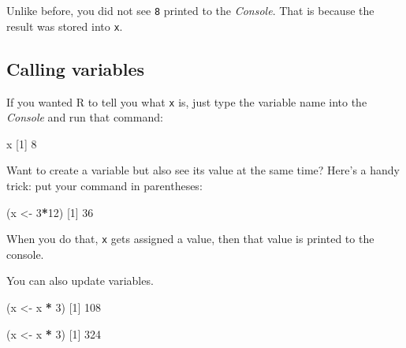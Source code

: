 \documentclass[
]{book}
\newenvironment{Shaded}{\begin{snugshade}}{\end{snugshade}}
\newcommand{\DecValTok}[1]{\textcolor[rgb]{0.00,0.00,0.81}{#1}}
\newcommand{\NormalTok}[1]{#1}
\newcommand{\OperatorTok}[1]{\textcolor[rgb]{0.81,0.36,0.00}{\textbf{#1}}}
\newcommand{\StringTok}[1]{\textcolor[rgb]{0.31,0.60,0.02}{#1}}
\begin{document}
Unlike before, you did not see \texttt{8} printed to the \emph{Console}. That is because the result was stored into \texttt{x}.

\hypertarget{calling-variables}{%
\subsection*{Calling variables}\label{calling-variables}}

If you wanted R to tell you what \texttt{x} is, just type the variable name into the \emph{Console} and run that command:

\begin{Shaded}
\begin{Highlighting}[]
\NormalTok{x}
\NormalTok{[}\DecValTok{1}\NormalTok{] }\DecValTok{8}
\end{Highlighting}
\end{Shaded}

Want to create a variable but also see its value at the same time? Here's a handy trick: put your command in parentheses:

\begin{Shaded}
\begin{Highlighting}[]
\NormalTok{(x <-}\StringTok{ }\DecValTok{3}\OperatorTok{*}\DecValTok{12}\NormalTok{)}
\NormalTok{[}\DecValTok{1}\NormalTok{] }\DecValTok{36}
\end{Highlighting}
\end{Shaded}

When you do that, \texttt{x} gets assigned a value, then that value is printed to the console.

You can also update variables.

\begin{Shaded}
\begin{Highlighting}[]
\NormalTok{(x <-}\StringTok{ }\NormalTok{x }\OperatorTok{*}\StringTok{ }\DecValTok{3}\NormalTok{)}
\NormalTok{[}\DecValTok{1}\NormalTok{] }\DecValTok{108}
\end{Highlighting}
\end{Shaded}

\begin{Shaded}
\begin{Highlighting}[]
\NormalTok{(x <-}\StringTok{ }\NormalTok{x }\OperatorTok{*}\StringTok{ }\DecValTok{3}\NormalTok{)}
\NormalTok{[}\DecValTok{1}\NormalTok{] }\DecValTok{324}
\end{Highlighting}
\end{Shaded}
\end{document}
